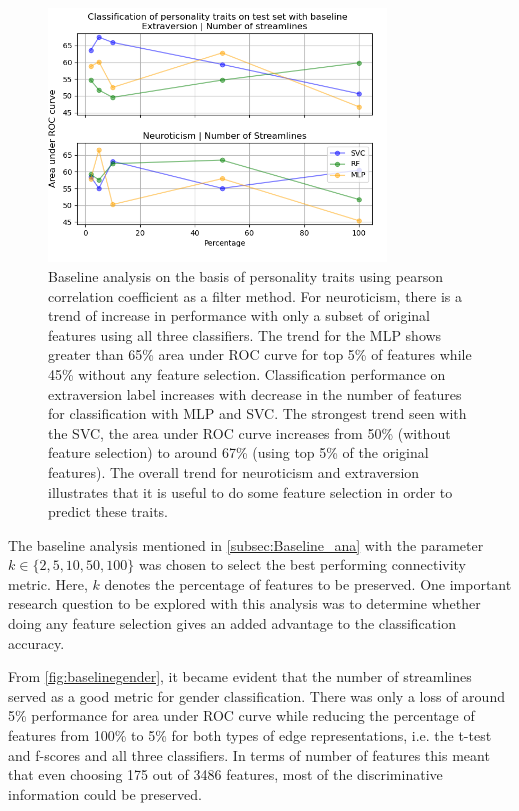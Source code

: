 \documentclass[msthesis.tex]{subfiles}
\begin{document}
\begin{figure}
    \centering
    \includegraphics[width=0.8\textwidth]{images/persona_2.png}
    \caption{Baseline analysis on the basis of personality traits using pearson correlation coefficient as a filter method. For neuroticism, there is a trend of increase in performance with only a subset of original features using all three classifiers. The trend for the \gls{MLP} shows greater than 65\% area under ROC curve for top 5\% of features while 45\% without any feature selection. Classification performance on extraversion label increases with decrease in the number of features for classification with MLP and SVC. The strongest trend seen with the SVC, the area under ROC curve increases from 50\% (without feature selection) to around 67\% (using top 5\% of the original features). The overall trend for neuroticism and extraversion illustrates that it is useful to do some feature selection in order to predict these traits.}
    \label{fig:persona base}
\end{figure}
The baseline analysis mentioned in \autoref{subsec:Baseline_ana} with the parameter $k \in \{2,5,10,50,100\}$ was chosen to select the best performing connectivity metric. Here, $k$ denotes the percentage of features to be preserved. One important research question to be explored with this analysis was to determine whether doing any feature selection gives an added advantage to the classification accuracy.

From \autoref{fig:baselinegender}, it became evident that the number of streamlines served as a good metric for gender classification. There was only a loss of around 5\% performance for area under ROC curve while reducing the percentage of features from 100\% to 5\% for both types of edge representations, i.e. the t-test and f-scores and all three classifiers. In terms of number of features this meant that even choosing 175 out of 3486 features, most of the discriminative information could be preserved.
\end{document}
